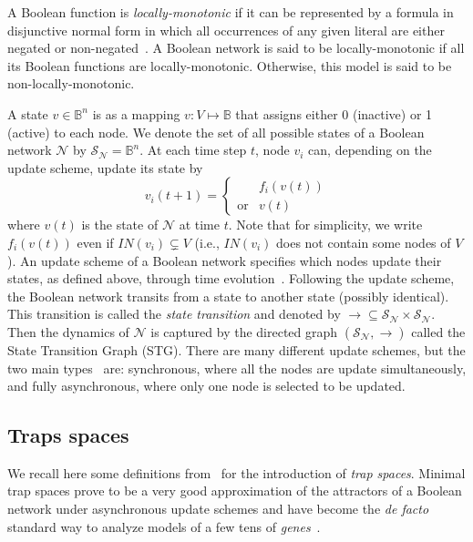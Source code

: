 \documentclass[preprint,12pt]{elsarticle}
\newcommand{\IN}{\mathit{IN}}
\begin{document}
A Boolean function is \emph{locally-monotonic} if it can be represented by a formula in disjunctive normal form in which all occurrences of any given literal are either negated or non-negated~\cite{Paulev2020}.
A Boolean network is said to be locally-monotonic if all its Boolean functions are locally-monotonic.
Otherwise, this model is said to be non-locally-monotonic.

A state \(v \in \mathbb{B}^{n}\) is as a mapping \(v \colon V \mapsto \mathbb{B}\) that assigns either 0 (inactive) or 1 (active) to each node.
We denote the set of all possible states of a Boolean network \(\mathcal{N}\) by \(\mathcal{S}_{\mathcal{N}} = \mathbb{B}^n\).
At each time step \(t\), node \(v_i\) can, depending on the update scheme, update its state by
\[v_i(t + 1) =
  \begin{cases}
    &f_i(v(t))\\
    \text{or} &v(t)
  \end{cases}
\]
where \(v(t)\) is the state of \(\mathcal{N}\) at time \(t\). %
Note that for simplicity, we write \(f_i(v(t))\) even if \(\IN(v_i) \subsetneq V\) (i.e., \(\IN(v_i)\) does not contain some nodes of \(V\)).
An update scheme of a Boolean network specifies which nodes update their states, as defined above, through time evolution~\cite{thomas1991regulatory}.
Following the update scheme, the Boolean network transits from a state to another state (possibly identical).
This transition is called the \emph{state transition} and denoted by \(\rightarrow \subseteq \mathcal{S}_{\mathcal{N}} \times \mathcal{S}_{\mathcal{N}}\).
Then the dynamics of \(\mathcal{N}\) is captured by the directed graph \((\mathcal{S}_{\mathcal{N}}, \rightarrow)\) called the State Transition Graph (STG).
There are many different update schemes, but the two main types~\cite{thomas1991regulatory} are: synchronous, where all the nodes are update simultaneously, and fully asynchronous, where only one node is selected to be updated.

\subsection{Traps spaces}

We recall here some definitions from~\cite{klarner2015computing} for the introduction of \emph{trap spaces}.
Minimal trap spaces prove to be a very good approximation of the attractors of a Boolean network under asynchronous update schemes and have become the \emph{de facto} standard way to analyze models of a few tens of \emph{genes}~\cite{klarner2017pyboolnet,cifuentes2020control}.
\end{document}
